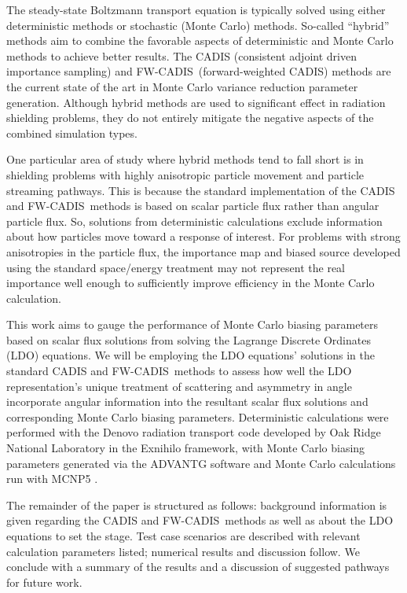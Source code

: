\documentclass{article} %
\newcommand{\fwc}{\mbox{FW-CADIS}}
\begin{document}
The steady-state Boltzmann transport equation is typically solved using either
deterministic methods or stochastic (Monte Carlo) methods. So-called
``hybrid'' methods aim to combine the favorable aspects of deterministic and
Monte Carlo methods to achieve better results. The CADIS (consistent adjoint
driven importance sampling) and \fwc\ (forward-weighted CADIS) methods are the
current state of the art in Monte Carlo variance reduction parameter
generation. Although hybrid methods are used to significant effect in
radiation shielding problems, they do not entirely mitigate the negative
aspects of the combined simulation types.

One particular area of study where hybrid methods tend to fall short is in
shielding problems with highly anisotropic particle movement and particle
streaming pathways. This is because the standard implementation of the CADIS
and \fwc\ methods is based on scalar particle flux rather than angular particle
flux. So, solutions from deterministic calculations exclude information about
how particles move toward a response of interest. For problems with strong
anisotropies in the particle flux, the importance map and biased source 
developed using the standard space/energy treatment may not represent the real
importance well enough to sufficiently improve efficiency in the Monte Carlo
calculation. 

This work aims to gauge the performance of Monte Carlo biasing parameters based
on scalar flux solutions from solving the Lagrange Discrete Ordinates (LDO)
equations. We will be employing the LDO equations' solutions in the standard
CADIS and \fwc\ methods to assess how well the LDO representation's unique
treatment of scattering and asymmetry in angle incorporate angular information
into the resultant scalar flux solutions and corresponding Monte Carlo biasing
parameters. Deterministic calculations were performed with the Denovo radiation
transport code developed by Oak Ridge National Laboratory \cite{denovo} in the
Exnihilo framework, with Monte Carlo biasing parameters generated via the
ADVANTG software \cite{advantg} and Monte Carlo calculations run with MCNP5
\cite{mcnp}.

The remainder of the paper is structured as follows: background information is
given regarding the CADIS and \fwc\ methods as well as about the LDO equations
to set the stage. Test case scenarios are described with relevant calculation
parameters listed; numerical results and discussion follow. We conclude with a
summary of the results and a discussion of suggested pathways for future work.
\end{document}
